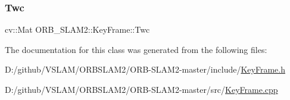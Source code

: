 \mbox{\label{class_o_r_b___s_l_a_m2_1_1_key_frame_a769de03e37e9531ab43625250287ff8c}} 
\subsubsection{\texorpdfstring{Twc}{Twc}}
{\footnotesize\ttfamily cv\+::\+Mat O\+R\+B\+\_\+\+S\+L\+A\+M2\+::\+Key\+Frame\+::\+Twc\hspace{0.3cm}{\ttfamily [protected]}}



The documentation for this class was generated from the following files\+:\begin{DoxyCompactItemize}
\item 
D\+:/github/\+V\+S\+L\+A\+M/\+O\+R\+B\+S\+L\+A\+M2/\+O\+R\+B-\/\+S\+L\+A\+M2-\/master/include/\mbox{\hyperlink{_key_frame_8h}{Key\+Frame.\+h}}\item 
D\+:/github/\+V\+S\+L\+A\+M/\+O\+R\+B\+S\+L\+A\+M2/\+O\+R\+B-\/\+S\+L\+A\+M2-\/master/src/\mbox{\hyperlink{_key_frame_8cpp}{Key\+Frame.\+cpp}}\end{DoxyCompactItemize}

